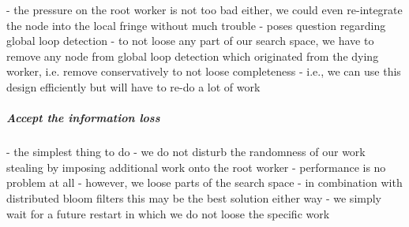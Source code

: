 - the pressure on the root worker is not too bad either, we could even re-integrate the node into the local fringe without much trouble
- poses question regarding global loop detection
- to not loose any part of our search space, we have to remove any node from global loop detection which originated from the dying worker, i.e. remove conservatively to not loose completeness
- i.e., we can use this design efficiently but will have to re-do a lot of work
\subparagraph{Accept the information loss}
- the simplest thing to do
- we do not disturb the randomness of our work stealing by imposing additional work onto the root worker
- performance is no problem at all
- however, we loose parts of the search space
- in combination with distributed bloom filters this may be the best solution either way
- we simply wait for a future restart in which we do not loose the specific work
